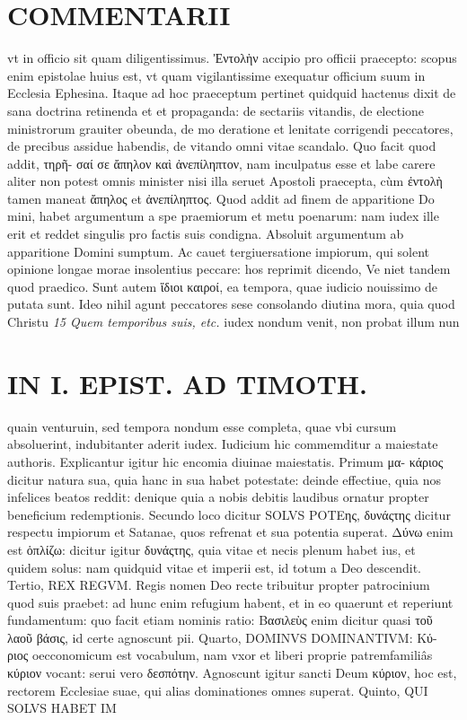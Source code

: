 \documentclass{article}
\begin{document}
\begin{pages}
\section*{COMMENTARII }
\marginpar{[ p.164 ]}\pstart vt in officio sit quam diligentissimus. Ἐντολὴν accipio pro officii praecepto: scopus enim epistolae huius est, vt quam vigilantissime exequatur officium suum in Ecclesia Ephesina. Itaque ad hoc praeceptum pertinet quidquid hactenus dixit de sana doctrina retinenda et et propaganda: de sectariis vitandis, de electione ministrorum grauiter obeunda, de mo deratione et lenitate corrigendi peccatores, de precibus assidue habendis, de vitando omni vitae scandalo. Quo facit quod addit, τηρῆ- σαί σε ἄπηλον καὶ ἀνεπίληπτον, nam inculpatus esse et labe carere aliter non potest omnis minister nisi illa seruet Apostoli praecepta, cùm ἐντολὴ tamen maneat ἄπηλος et ἀνεπίληπτος. Quod addit ad finem de apparitione Do mini, habet argumentum a spe praemiorum et metu poenarum: nam iudex ille erit et reddet singulis pro factis suis condigna. Absoluit argumentum ab apparitione Domini sumptum. Ac cauet tergiuersatione impiorum, qui solent opinione longae morae insolentius peccare: hos reprimit dicendo, Ve niet tandem quod praedico. Sunt autem ἵδιοι καιροί, ea tempora, quae iudicio nouissimo de putata sunt. Ideo nihil agunt peccatores sese consolando diutina mora, quia quod Christu  \pend
\textit{15 Quem temporibus suis, etc. }\pstart iudex nondum venit, non probat illum nun\pend
\section*{IN I. EPIST. AD TIMOTH. }
\marginpar{[ p.165 ]}\pstart quain venturuin, sed tempora nondum esse completa, quae vbi cursum absoluerint, indubitanter aderit iudex. Iudicium hic commemditur a maiestate authoris. Explicantur igitur hic encomia diuinae maiestatis. Primum μα- κάριος dicitur natura sua, quia hanc in sua habet potestate: deinde effectiue, quia nos infelices beatos reddit: denique quia a nobis debitis laudibus ornatur propter beneficium redemptionis. Secundo loco dicitur SOLVS POΤEης, δυνάςτης dicitur respectu impiorum et Satanae, quos refrenat et sua potentia superat. Δύνω enim est ὁπλίζω: dicitur igitur δυνάςτης, quia vitae et necis plenum habet ius, et quidem solus: nam quidquid vitae et imperii est, id totum a Deo descendit. Tertio, REX REGVM. Regis nomen Deo recte tribuitur propter patrocinium quod suis praebet: ad hunc enim refugium habent, et in eo quaerunt et reperiunt fundamentum: quo facit etiam nominis ratio: Βασιλεὺς enim dicitur quasi τοῦ λαοῦ βάσις, id certe agnoscunt pii.  \pend\pstart Quarto, DOMINVS DOMINANTIVM: Κύ- ριος oecconomicum est vocabulum, nam vxor et liberi proprie patremfamiliâs κύριον vocant: serui vero δεσπότην. Agnoscunt igitur sancti Deum κύριον, hoc est, rectorem Ecclesiae suae, qui alias dominationes omnes superat.  \pend\pstart Quinto, QUI SOLVS HABET IM\pend

\end{pages}
\end{document}
